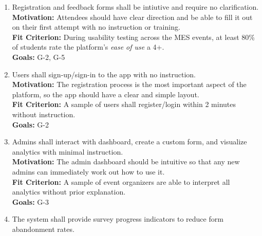 \documentclass[12pt]{article}
\begin{document}
\begin{enumerate}[label=\bfseries ER-\arabic*:, wide=0pt, leftmargin=*, 
  ref=\bfseries UHR-EoU.\arabic*]
  \item \label{UHEUR1} Registration and feedback forms shall be intiutive and require no clarification.\\[2mm]
    {\bf Motivation:} Attendees should have clear direction and be able to fill it out on their first attempt with no instruction or training.\\
    {\bf Fit Criterion:} During usability testing across the MES events, at least 80\% of students rate the platform's \textit{ease of use} a 4+.\\
    {\bf Goals:} G-2, G-5
  \item \label{UHEUR2} Users shall sign-up/sign-in to the app with no instruction. \\[2mm]
    {\bf Motivation:} The registration process is the most important aspect of the platform, so the app should have a clear and simple layout.\\
    {\bf Fit Criterion:} A sample of users shall register/login within 2 minutes without instruction.\\
    {\bf Goals:} G-2
  \item \label{UHEUR3} Admins shall interact with dashboard, create a custom form, and visualize analytics with minimal instruction.\\[2mm]
    {\bf Motivation:} The admin dashboard should be intuitive so that any new admins can immediately work out how to use it.\\
    {\bf Fit Criterion:} A sample of event organizers are able to interpret all analytics without prior explanation.\\
    {\bf Goals:} G-3
  \item \label{UHEUR4} The system shall provide survey progress indicators to reduce form abandonment
    rates.
\end{enumerate}
\end{document}
